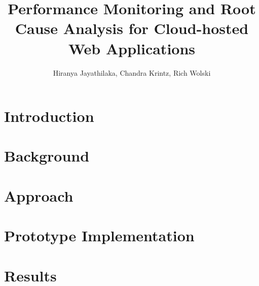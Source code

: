 \documentclass[sigconf]{acmart}
\begin{document}
%

\title{Performance Monitoring and Root Cause Analysis for Cloud-hosted Web Applications}

\author{Hiranya Jayathilaka, Chandra Krintz, Rich Wolski}

\begin{abstract}

\end{abstract}


\maketitle

%
%



\section{Introduction}


\section{Background}
\label{sec:background}


\section{Approach}
\label{sec:approach}


\section{Prototype Implementation}
\label{sec:impl}


\section{Results}
\label{sec:results}

\end{document}
